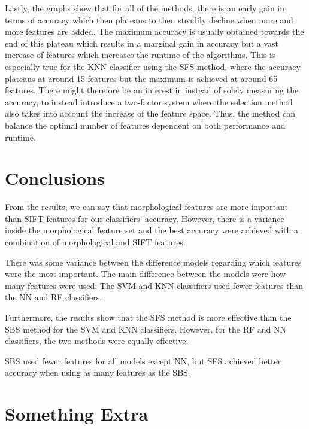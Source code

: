 \documentclass{kththesis}
\begin{document}
Lastly, the graphs  show that for all of the methods, there is an early gain in terms of accuracy which then plateaus to then steadily decline when more and more features are added. The maximum accuracy is usually obtained towards the end of this plateau which results in a marginal gain in accuracy but a vast increase of features which increases the runtime of the algorithms. This is especially true for the KNN classifier using the SFS method, where the accuracy plateaus at around 15 features but the maximum is achieved at around 65 features. There might therefore be an interest in instead of solely measuring the accuracy, to instead introduce a two-factor system where the selection method also takes into account the increase of the feature space. Thus, the method can balance the optimal number of features dependent on both performance and runtime.


\chapter{Conclusions}

From the results, we can say that morphological features are more important than SIFT features for our classifiers' accuracy. However, there is a variance inside the morphological feature set and the best accuracy were achieved with a combination of morphological and SIFT features.

There was some variance between the difference models regarding which features were the most important. The main difference between the models were how many features were used. The SVM and KNN classifiers used fewer features than the NN and RF classifiers. 

Furthermore, the results show that the SFS method is more effective than the SBS method for the SVM and KNN classifiers. However, for the RF and NN classifiers, the two methods were equally effective.

SBS used fewer features for all models except NN, but SFS achieved better accuracy when using as many features as the SBS. %

\printbibliography[heading=bibintoc]

\appendix

\chapter{Something Extra}

\tailmatter
\end{document}

